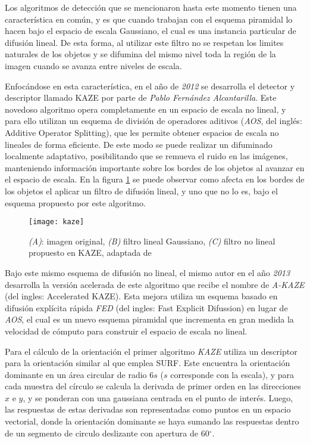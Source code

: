 Los algoritmos de detección que se mencionaron hasta este momento tienen una característica en común, y es que cuando trabajan con el esquema piramidal lo hacen bajo el espacio de escala Gaussiano, el cual es una instancia particular de difusión lineal. De esta forma, al utilizar este filtro no se respetan los limites naturales de los objetos y se difumina del mismo nivel toda la región de la imagen cuando se avanza entre niveles de escala.

Enfocándose en esta característica, en el año de \textit{2012} se desarrolla el detector y descriptor llamado KAZE \cite{kaze} por parte de \textit{Pablo Fernández Alcantarilla}. Este novedoso algoritmo opera completamente en un espacio de escala no lineal, y para ello utilizan un esquema de división de operadores aditivos (\textit{AOS}, del inglés: Additive Operator Splitting), que les permite obtener espacios de escala no lineales de forma eficiente. De este modo se puede realizar un difuminado localmente adaptativo, posibilitando que se remueva el ruido en las imágenes, manteniendo información importante sobre los bordes de los objetos al avanzar en el espacio de escala. En la figura \ref{imagen:kaze} se puede observar como afecta en los bordes de los objetos el aplicar un filtro de difusión lineal, y uno que no lo es, bajo el esquema propuesto por este algoritmo.

\begin{figure}[H]
	\centering
	\texttt{[image: kaze]}
	\caption[Filtro no lineal propuesto por KAZE]{\textit{(A)}: imagen original, \textit{(B)} filtro lineal Gaussiano, \textit{(C)} filtro no lineal propuesto en KAZE, adaptada de \cite{kaze}}
	\label{imagen:kaze}
\end{figure}

Bajo este mismo esquema de difusión no lineal, el mismo autor en el año \textit{2013} desarrolla la versión acelerada de este algoritmo que recibe el nombre de \textit{A-KAZE} \cite{akaze} (del ingles: Accelerated KAZE). Esta mejora utiliza un esquema basado en difusión explícita rápida \textit{FED} (del ingles: Fast Explicit Difussion) en lugar de \textit{AOS}, el cual es un nuevo esquema piramidal que incrementa en gran medida la velocidad de cómputo para construir el espacio de escala no lineal.

Para el cálculo de la orientación el primer algoritmo \textit{KAZE} utiliza un descriptor para la orientación similar al que emplea SURF. Este encuentra la orientación dominante en un área circular de radio 6$s$ ($s$ corresponde con la escala), y para cada muestra del círculo se calcula la derivada de primer orden en las direcciones $x$ e $y$, y se ponderan con una gaussiana centrada en el punto de interés. Luego, las respuestas de estas derivadas son representadas como puntos en un espacio vectorial, donde la orientación dominante se haya sumando las respuestas dentro de un segmento de circulo deslizante con apertura de 60$^\circ$.

